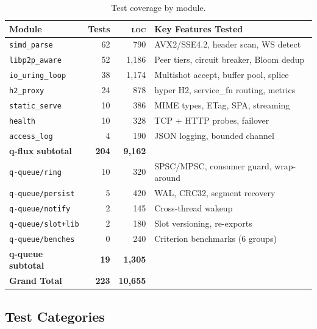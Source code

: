 \documentclass[a4paper, 11pt]{article}
\newcommand{\loc}{\textsc{loc}}
\begin{document}
\begin{table}[H]
\centering
\caption{Test coverage by module.}
\label{tab:tests}
\begin{tabular}{@{}lrrl@{}}
\toprule
\textbf{Module} & \textbf{Tests} & \textbf{\loc{}} & \textbf{Key Features Tested} \\
\midrule
\texttt{simd\_parse}      & 62 &   790 & AVX2/SSE4.2, header scan, WS detect \\
\texttt{libp2p\_aware}    & 52 & 1,186 & Peer tiers, circuit breaker, Bloom dedup \\
\texttt{io\_uring\_loop}  & 38 & 1,174 & Multishot accept, buffer pool, splice \\
\texttt{h2\_proxy}        & 24 &   878 & hyper H2, service\_fn routing, metrics \\
\texttt{static\_serve}    & 10 &   386 & MIME types, ETag, SPA, streaming \\
\texttt{health}           & 10 &   328 & TCP + HTTP probes, failover \\
\texttt{access\_log}      &  4 &   190 & JSON logging, bounded channel \\
\midrule
\textbf{q-flux subtotal}  & \textbf{204} & \textbf{9,162} & \\
\midrule
\texttt{q-queue/ring}     & 10 &   320 & SPSC/MPSC, consumer guard, wrap-around \\
\texttt{q-queue/persist}  &  5 &   420 & WAL, CRC32, segment recovery \\
\texttt{q-queue/notify}   &  2 &   145 & Cross-thread wakeup \\
\texttt{q-queue/slot+lib} &  2 &   180 & Slot versioning, re-exports \\
\midrule
\texttt{q-queue/benches}  &  0 &   240 & Criterion benchmarks (6 groups) \\
\textbf{q-queue subtotal} & \textbf{19} & \textbf{1,305} & \\
\midrule
\textbf{Grand Total}      & \textbf{223} & \textbf{10,655} & \\
\bottomrule
\end{tabular}
\end{table}

\subsection{Test Categories}
\end{document}
